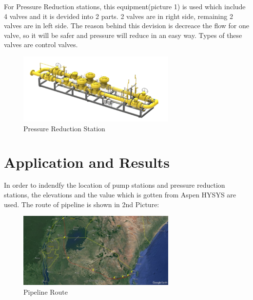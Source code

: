 \documentclass[12pt]{article}
\begin{document}
 {\fontsize{12}{12}\selectfont 
	\hspace*{1em} For Pressure Reduction stations, this equipment(picture 1) is used which include 4 valves and it is devided into 2 parts. 2 valves are in right side, remaining 2 valves are in left side. The reason behind this devision is decreace the flow for one valve, so it will be safer and pressure will reduce in an easy way. Types of these valves are control valves.
 	\\

 }

 \begin{figure}[h!]
	\centering
	\includegraphics[width=0.7\textwidth]{assets/images/pressure_reduction_station.png}
	\caption{Pressure Reduction Station}
	\label{fig:your_image}
 \end{figure}


\section*{Application and Results}
{\fontsize{12}{12}\selectfont 
In order to indendfy the location of pump stations and pressure reduction stations, the elevations and the value which is gotten from Aspen HYSYS are used. The route of pipeline is shown in 2nd Picture:
\\

}

\begin{figure}[h!]
	\centering
	\includegraphics[width=0.7\textwidth]{assets/images/pipeline_route.jpg}
	\caption{Pipeline Route}
	\label{fig:your_image}
 \end{figure}
\end{document}
